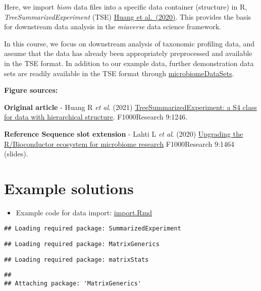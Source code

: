 \documentclass[
  oneside]{book}
\providecommand{\tightlist}{%
  \setlength{\itemsep}{0pt}\setlength{\parskip}{0pt}}
\begin{document}
Here, we import \emph{biom} data files into a specific data container (structure)
in R, \emph{TreeSummarizedExperiment} (TSE) \href{https://f1000research.com/articles/9-1246}{Huang et
al.~(2020)}. This provides
the basis for downstream data analysis in the \emph{miaverse} data science
framework.

In this course, we focus on downstream analysis of taxonomic profiling
data, and assume that the data has already been appropriately
preprocessed and available in the TSE format. In addition to our
example data, further demonstration data sets are readily available in
the TSE format through
\href{https://bioconductor.org/packages/release/data/experiment/html/microbiomeDataSets.html}{microbiomeDataSets}.

\textbf{Figure sources:}

\textbf{Original article}
- Huang R \emph{et al}. (2021) \href{https://doi.org/10.12688/\%20f1000research.26669.2}{TreeSummarizedExperiment: a S4 class
for data with hierarchical structure}. F1000Research 9:1246.

\textbf{Reference Sequence slot extension}
- Lahti L \emph{et al}. (2020) \href{https://doi.org/10.7490/\%20f1000research.1118447.1}{Upgrading the R/Bioconductor ecosystem for microbiome
research} F1000Research 9:1464 (slides).

\hypertarget{example-solutions}{%
\section{Example solutions}\label{example-solutions}}

\begin{itemize}
\tightlist
\item
  Example code for data import: \url{import.Rmd}
\end{itemize}

\begin{verbatim}
## Loading required package: SummarizedExperiment
\end{verbatim}

\begin{verbatim}
## Loading required package: MatrixGenerics
\end{verbatim}

\begin{verbatim}
## Loading required package: matrixStats
\end{verbatim}

\begin{verbatim}
## 
## Attaching package: 'MatrixGenerics'
\end{verbatim}
\end{document}
